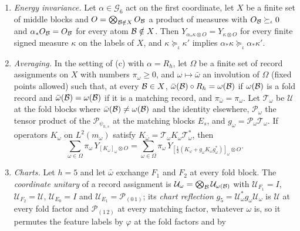 \begin{lemma}
\begin{enumerate}[label=(\alph*)]
 permuted by $\varphi$. The record differences satisfy
 $D_{F_2}=\mathcal UD_{F_1}^*\mathcal U^*$, hence
 $D^{\rm a}_{F_2}=-\mathcal UD^{\rm a}_{F_1}\mathcal U^*$ and
 $D^{\rm s}_{F_2}=\mathcal UD^{\rm s}_{F_1}\mathcal U^*$, and \ref{it:env:N2} holds.
 $\mathcal U$ identifies operators only; it is never applied to the input $F_A$,
 and no negation symmetry of the set $A$ is used.
\item \emph{Energy invariance.} Let $\alpha\in\mathcal G_6$ act on the first
 coordinate, let $X$ be a finite set of middle blocks and
 $O=\bigotimes_{\mathcal B\notin X}O_\mathcal B$ a product of measures with
 $O_\mathcal B\succeq_\iota0$ and $\alpha_*O_\mathcal B=O_\mathcal B$ for every atom $\mathcal B\notin X$.
 Then $Y_{\alpha_*\kappa\otimes O}=Y_{\kappa\otimes O}$ for every finite signed measure
 $\kappa$ on the labels of $X$, and $\kappa\succeq_\iota\kappa'$ implies
 $\alpha_*\kappa\succeq_\iota\alpha_*\kappa'$.
\item \emph{Averaging.} In the setting of (c) with $\alpha=R_h$, let $\Omega$ be a
 finite set of record assignments on $X$ with numbers $\pi_\omega\ge0$, and
 $\omega\mapsto\bar\omega$ an involution of $\Omega$ (fixed points allowed) such
 that, at every $\mathcal B\in X$, $\bar\omega(\mathcal B)\circ R_h=\omega(\mathcal B)$ if
 $\omega(\mathcal B)$ is a fold record and $\bar\omega(\mathcal B)=\omega(\mathcal B)$ if it is a
 matching record, and $\pi_{\bar\omega}=\pi_\omega$. Let $\mathcal T_\omega$ be
 $\mathcal U$ at the fold blocks where $\bar\omega(\mathcal B)\ne\omega(\mathcal B)$ and the
 identity elsewhere, $\mathcal P_\omega$ the tensor product of the
 $\mathcal P_{\psi_{h,s}}$ at the matching blocks $E_s$, and
 $g_\omega=\mathcal P_\omega\mathcal T_\omega$. If operators $K_\omega$ on
 $L^2(m_\omega)$ satisfy $K_{\bar\omega}=\mathcal T_\omega K_\omega\mathcal T_\omega^*$,
 then
 \[
  \sum_{\omega\in\Omega}\pi_\omega\,Y_{[K_\omega]_\omega\otimes O}
  =\sum_{\omega\in\Omega}\pi_\omega\,
  Y_{[\frac12(K_\omega+g_\omega K_\omega g_\omega^*)]_\omega\otimes O}.
 \]
\item \emph{Charts.} Let $h=5$ and let $\bar\omega$ exchange $F_1$ and $F_2$ at every
 fold block. The \emph{coordinate unitary} of a record assignment is
 $\mathcal U_\omega=\bigotimes_\mathcal B\mathcal U_{\omega(\mathcal B)}$ with
 $\mathcal U_{F_1}=I$, $\mathcal U_{F_2}=\mathcal U$, $\mathcal U_{E_0}=I$ and
 $\mathcal U_{E_1}=\mathcal P_{(0\,1)}$; its \emph{chart reflection}
 $g_5=\mathcal U_\omega^*g_\omega\mathcal U_\omega$ is $\mathcal U$ at every fold
 factor and $\mathcal P_{(1\,2)}$ at every matching factor, whatever $\omega$ is,
 so it permutes the feature labels by $\varphi$ at the fold factors and by

\end{enumerate}
\end{lemma}
